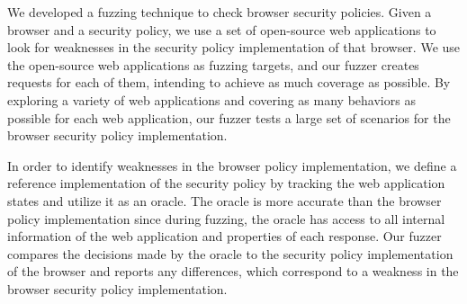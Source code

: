 \documentclass[10pt,conference]{IEEEtran}
\begin{document}
 

We developed a fuzzing technique to check browser security policies. 
Given a browser and a security policy, we use a set of open-source web applications to look for weaknesses in the security policy implementation of that browser. We use the open-source web applications as fuzzing targets, and our fuzzer creates requests for each of them, intending to achieve as much coverage as possible. By exploring a variety of web applications and covering as many behaviors as possible for each web application, our fuzzer tests a large set of scenarios for the browser security policy implementation. %



In order to identify weaknesses in the browser policy implementation, we define a reference implementation of the security policy by tracking the web application states and utilize it as an oracle. The oracle is more accurate than the browser policy implementation since during fuzzing, the oracle has access to all internal information of the web application and properties of each response. Our fuzzer compares the decisions made by the oracle to the security policy implementation of the browser and reports any differences, which correspond to a weakness in the browser security policy implementation. 



\end{document}
